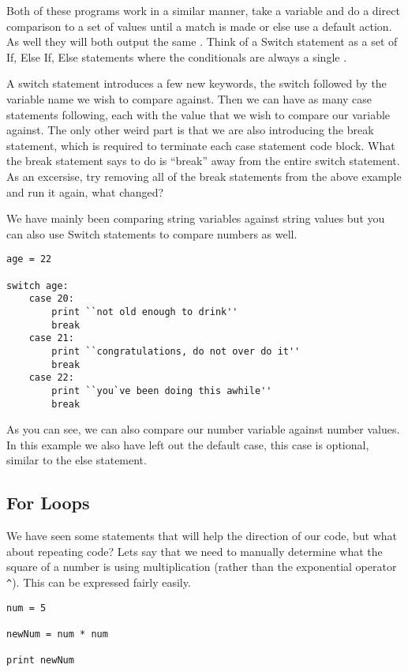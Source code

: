 Both of these programs work in a similar manner, take a variable and do a direct comparison to a set of values until a match is made or else use a default action.
As well they will both output the same .
Think of a Switch statement as a set of If, Else If, Else statements where the conditionals are always a single \pigVar{==}.
\par

A switch statement introduces a few new keywords, the switch followed by the variable name we wish to compare against.
Then we can have as many case statements following, each with the value that we wish to compare our variable against.
The only other weird part is that we are also introducing the break statement, which is required to terminate each case statement code block.
What the break statement says to do is ``break'' away from the entire switch statement.
As an excersise, try removing all of the break statements from the above example and run it again, what changed?
\par

We have mainly been comparing string variables against string values but you can also use Switch statements to compare numbers as well.

\begin{lstlisting}[caption={Switch Statement Numbers Example}]
age = 22

switch age:
    case 20:
        print ``not old enough to drink''
        break
    case 21:
        print ``congratulations, do not over do it''
        break
    case 22:
        print ``you`ve been doing this awhile''
        break
\end{lstlisting}

As you can see, we can also compare our number variable against number values.
In this example we also have left out the default case, this case is optional, similar to the else statement.

\subsection{For Loops}
We have seen some statements that will help the direction of our code, but what about repeating code?
Lets say that we need to manually determine what the square of a number is using multiplication (rather than the exponential operator \verb|^|).
This can be expressed fairly easily.

\begin{lstlisting}[caption={Square Without Loop}]
num = 5

newNum = num * num

print newNum
\end{lstlisting}

